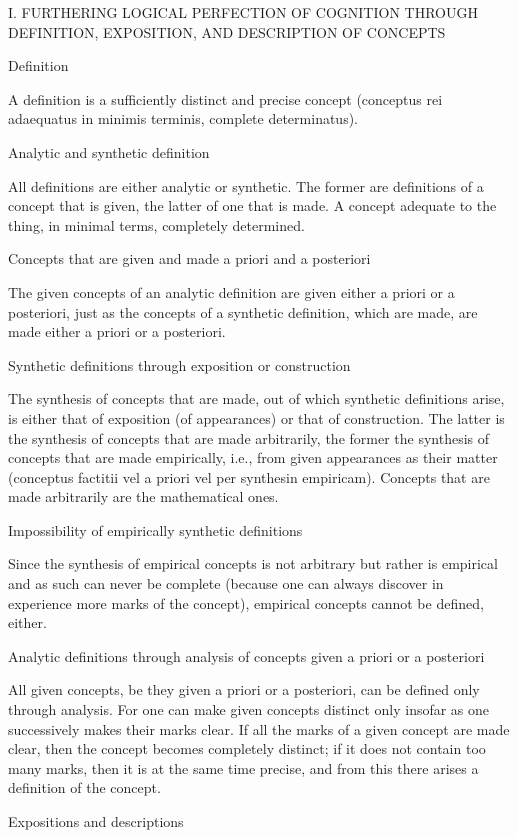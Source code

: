 I. FURTHERING LOGICAL PERFECTION OF COGNITION THROUGH
DEFINITION, EXPOSITION, AND DESCRIPTION OF CONCEPTS

Definition

A definition is a sufficiently distinct and precise concept
(conceptus rei adaequatus in minimis terminis, complete determinatus).

Analytic and synthetic definition

All definitions are either analytic or synthetic.
The former are definitions of a concept that is given,
the latter of one that is made.
A concept adequate to the thing, in minimal terms, completely determined.

Concepts that are given and made a priori and a posteriori

The given concepts of an analytic definition
are given either a priori or a posteriori,
just as the concepts of a synthetic definition, which are made,
are made either a priori or a posteriori.

Synthetic definitions through exposition or construction

The synthesis of concepts that are made,
out of which synthetic definitions arise,
is either that of exposition (of appearances)
or that of construction.
The latter is the synthesis of concepts
that are made arbitrarily,
the former the synthesis of concepts
that are made empirically,
i.e., from given appearances as their matter
(conceptus factitii vel a priori vel per synthesin empiricam).
Concepts that are made arbitrarily are the mathematical ones.

Impossibility of empirically synthetic definitions

Since the synthesis of empirical concepts is not arbitrary but
rather is empirical and as such can never be complete
(because one can always discover in experience more marks of the concept),
empirical concepts cannot be defined, either.

Analytic definitions through analysis of
concepts given a priori or a posteriori

All given concepts, be they given a priori or a posteriori,
can be defined only through analysis.
For one can make given concepts distinct only insofar as
one successively makes their marks clear.
If all the marks of a given concept are made clear,
then the concept becomes completely distinct;
if it does not contain too many marks,
then it is at the same time precise,
and from this there arises a definition of the concept.

Expositions and descriptions

